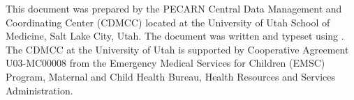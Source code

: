 {

 This document was prepared by the PECARN Central  Data Management
 and Coordinating Center
 (CDMCC) located at
 the University of Utah School of Medicine, Salt Lake City, Utah.  The document was
 written and typeset using \LaTeXe.
 The CDMCC at the University of Utah
 is supported by Cooperative Agreement U03-MC00008   from the
 Emergency Medical Services for Children (EMSC) Program, Maternal
  and Child Health Bureau, Health Resources and Services Administration.
  }{}
  

\endinput